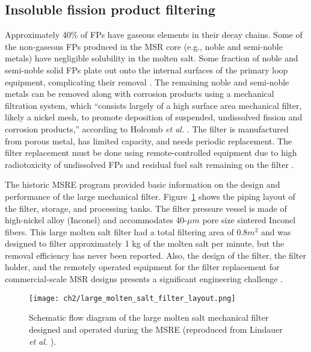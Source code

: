 \subsection{Insoluble fission product filtering}
Approximately 40\% of \glspl{FP} have gaseous elements in their decay chains. 
Some of the non-gaseous \glspl{FP} produced in the \gls{MSR} core (e.g., 
noble and semi-noble metals) have negligible solubility in the molten salt. 
Some fraction of noble and semi-noble solid \glspl{FP} plate out onto 
the internal surfaces of the primary loop equipment, complicating their 
removal \cite{briggs_molten-salt_1964}. The remaining noble and semi-noble 
metals can be removed along with corrosion products using a mechanical 
filtration system, which ``consists largely of a high surface area mechanical 
filter, likely a nickel mesh, to promote deposition of suspended, undissolved 
fission and corrosion products,'' according to Holcomb \emph{et al.} 
\cite{holcomb_instrumentation_2018}. The filter is manufactured from porous 
metal, has limited capacity, and needs periodic replacement. The filter 
replacement must be done using remote-controlled equipment due to high 
radiotoxicity of undissolved \glspl{FP} and residual fuel salt remaining on 
the filter \cite{mcfarlane_review_2019-1}. 

The historic \gls{MSRE} program provided basic information on the design and 
performance of the large mechanical filter. 
Figure~\ref{fig:large_filter_layout} shows the piping layout of the filter, 
storage, and processing tanks. The filter pressure vessel is made of 
high-nickel alloy (Inconel) and accommodates 40-$\mu m$ pore size sintered 
Inconel fibers. This large molten salt filter had a total filtering area of 
0.8${m^2}$ and was designed to filter approximately 1 kg of the molten salt 
per minute, but the removal efficiency has never been reported. Also, the 
design of the filter, the filter holder, and the remotely operated equipment 
for the filter replacement for commercial-scale \gls{MSR} designs presents a 
significant engineering challenge 
\cite{mcfarlane_review_2019-1}.
\begin{figure}[htp!] %
	\centering
	\texttt{[image: ch2/large\_molten\_salt\_filter\_layout.png]}
	\caption{Schematic flow diagram of the large molten salt mechanical filter 
		designed and operated during the \gls{MSRE} (reproduced from 
		Lindauer \emph{et al.} \cite{lindauer_design_1969}).}
	\label{fig:large_filter_layout}
\end{figure}

